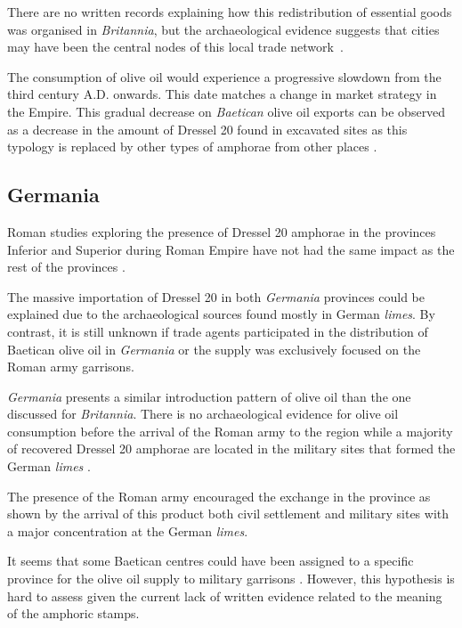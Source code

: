 \documentclass[review]{elsarticle}
\begin{document}
There are no written records explaining how this redistribution of essential goods was organised in \textit{Britannia}, but the archaeological evidence suggests that cities may have been the central nodes of this local trade network~\citep[45]{funari_economic_2005}.

The consumption of olive oil would experience a progressive slowdown from the third century A.D. onwards. This date matches a change in market strategy in the Empire. This gradual decrease on \textit{Baetican} olive oil exports can be observed as a decrease in the amount of Dressel 20 found in excavated sites as this typology is replaced by other types of amphorae from other places \citep{rodriguez1991aceite,millet_anforas_1998}.


\subsection{Germania}

Roman studies exploring the presence of Dressel 20 amphorae in the provinces Inferior and Superior during Roman Empire have not had the same impact as the rest of the provinces \citep[293]{remesal_baetica_2002}.

The massive importation of Dressel 20 in both \textit{Germania} provinces could be explained due to the archaeological sources found mostly in German \textit{limes}. 
By contrast, it is still unknown if trade agents participated in the distribution of Baetican olive oil in \textit{Germania} or the supply was exclusively focused on the Roman army garrisons\citep[156]{remesal_germn_2010}.


\textit{Germania} presents a similar introduction pattern of olive oil than the one discussed for \textit{Britannia}. There is no archaeological evidence for olive oil consumption before the arrival of the Roman army to the region while a majority of recovered Dressel 20 amphorae are located in the military sites that formed the German \textit{limes} \citep{remesal_germaniaengl_2002}.

The presence of the Roman army encouraged the exchange in the province as shown by the arrival of this product both civil settlement and military sites with a major concentration at the German \textit{limes}.

It seems that some Baetican centres could have been assigned to a specific province for the olive oil supply to military garrisons \citep[125]{remesal_concierto}. However, this hypothesis is hard to assess given the current lack of written evidence related to the meaning of the amphoric stamps. 
\end{document}
